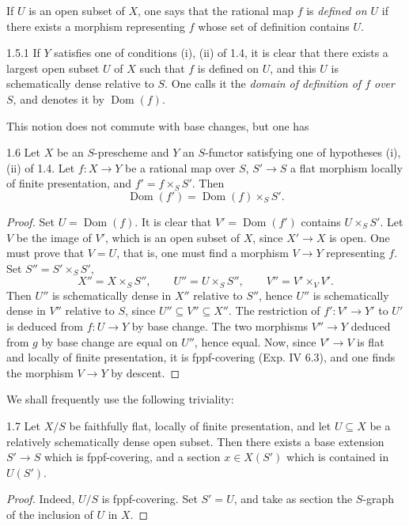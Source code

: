 If \(U\) is an open subset of \(X\), one says that
the rational map \(f\) is \emph{defined on \(U\)}
if there exists a morphism representing \(f\) whose
set of definition contains \(U\).
\begin{definition}{1.5.1}\label{XVIII.1.5.1}
If \(Y\) satisfies one of conditions (i), (ii) of
1.4, it is clear that there exists a largest open
subset \(U\) of \(X\) such that \(f\) is defined on
\(U\), and this \(U\) is schematically dense relative
to \(S\). One calls it the \emph{domain of definition
of \(f\) over \(S\)}, and denotes it by \(\operatorname{Dom}(f)\).
\end{definition}
This notion does not commute with base changes, but one has
\begin{proposition}{1.6}\label{XVIII.1.6}
Let \(X\) be an \(S\)-prescheme and \(Y\) an
\(S\)-functor satisfying one of hypotheses (i), (ii)
of 1.4. Let \(f:X\to Y\) be a rational map over
\(S\), \(S'\to S\) a flat morphism locally of finite
presentation, and \(f'=f\times_S S'\). Then
\[
\operatorname{Dom}(f')=\operatorname{Dom}(f)\times_S S'.
\]
\end{proposition}
\begin{proof}
Set \(U=\operatorname{Dom}(f)\).
It is clear that \(V'=\operatorname{Dom}(f')\)
contains \(U\times_S S'\).
Let \(V\) be the image of \(V'\), which is an
open subset of \(X\), since \(X'\to X\) is open.
One must prove that \(V=U\), that is, one must
find a morphism \(V\to Y\) representing \(f\).
Set \(S''=S'\times_S S'\),
\[
X''=X\times_S S'',\qquad U''=U\times_S S'',\qquad
V''=V'\times_V V'.
\]
Then \(U''\) is schematically dense in \(X''\)
relative to \(S''\), hence \(U''\) is schematically
dense in \(V''\) relative to \(S\), since
\(U''\subseteq V''\subseteq X''\).
The restriction of \(f':V'\to Y'\) to \(U'\)
is deduced from \(f:U\to Y\) by base change.
The two morphisms \(V''\to Y\) deduced from
\(g\) by base change are equal on \(U''\), hence
equal. Now, since \(V'\to V\) is flat and
locally of finite presentation, it is fppf-covering
(Exp. IV 6.3), and one finds the morphism \(V\to Y\)
by descent.
\end{proof}
We shall frequently use the following triviality:
\begin{proposition}{1.7}\label{XVIII.1.7}
Let \(X/S\) be faithfully flat, locally of finite
presentation, and let \(U\subseteq X\) be a relatively
schematically dense open subset.
Then there exists a base extension \(S'\to S\)
which is fppf-covering, and a section \(x\in X(S')\)
which is contained in \(U(S')\).
\end{proposition}
\begin{proof}
Indeed, \(U/S\) is fppf-covering.
Set \(S'=U\), and take as section the \(S\)-graph
of the inclusion of \(U\) in \(X\).
\end{proof}

